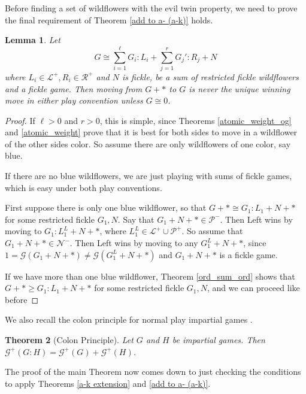 \documentclass{amsart}
\theoremstyle{plain}
\newtheorem{thm}{Theorem}
\newtheorem{lemma}[thm]{Lemma}
\theoremstyle{definition}
\theoremstyle{remark}
\numberwithin{equation}{section}
\numberwithin{thm}{section}
\begin{document}
Before finding a set of wildflowers with the evil twin property, we need to prove the final requirement of Theorem \ref{add to a- (a-k)} holds.
\begin{lemma}
    \label{star moves suboptimal}
    Let \begin{equation}
        G  \cong \sum_{i=1}^{\ell} G_i:L_i+\sum_{j=1}^{r} G_j':R_j  +N
    \end{equation}
    where $L_i \in \mathcal{L}^+,R_i \in \mathcal{R}^+$ and $N$ is fickle, be a sum of restricted fickle wildflowers and a fickle game. Then moving from $G+*$ to $G$ is never the unique winning move in either play convention unless $G \cong 0$.
\end{lemma}
\begin{proof}

If $\ell>0$ and $r>0$, this is simple, since Theorems \ref{atomic_weight_og} and \ref{atomic_weight} prove that it is best for both sides to move in a wildflower of the other sides color. So assume there are only wildflowers of one color, say blue.
 
If there are no blue wildflowers, we are just playing with sums of fickle games, which is easy under both play conventions.

First suppose there is only one blue wildflower, so that $G+* \cong G_1:L_1 + N+*$ for some restricted fickle $G_1,N$. Say that $G_1 + N+* \in \mathcal{P}^-$. Then Left wins by moving to $G_1:L_1^L + N+*$, where $L_1^L \in \mathcal{L}^+\cup\mathcal{P}^+$. So assume that $G_1 + N +* \in \mathcal{N}^-$. Then Left wins by moving to any $G_1^L + N+*$, since $ 1= \mathcal{G}(G_1 +N+*) \neq \mathcal{G}(G_1^L+N+*)$ and $G_1 + N+*$ is a fickle game. 

If we have more than one blue wildflower, Theorem \ref{ord_sum_ord} shows that $G+* \geq G_1:L_1 + N+*$ for some restricted fickle $G_1,N$, and we can proceed like before
\end{proof}
We also recall the colon principle for normal play impartial games \cite[191]{WinningWays}. 

\begin{thm}[Colon Principle]
    Let $G$ and $H$ be impartial games. Then $\mathcal{G}^+(G:H) = \mathcal{G}^+(G) + \mathcal{G}^+(H)$.
\end{thm}
The proof of the main Theorem now comes down to just checking the conditions to apply Theorems \ref{a-k extension} and \ref{add to a- (a-k)}.
\end{document}
